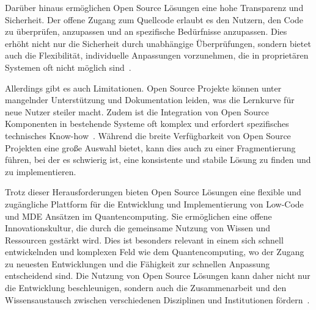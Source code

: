 Darüber hinaus ermöglichen Open Source Lösungen eine hohe Transparenz und Sicherheit. Der offene Zugang 
zum Quellcode erlaubt es den Nutzern, den Code zu überprüfen, anzupassen und an spezifische Bedürfnisse 
anzupassen. Dies erhöht nicht nur die Sicherheit durch unabhängige Überprüfungen, sondern bietet auch 
die Flexibilität, individuelle Anpassungen vorzunehmen, die in proprietären Systemen oft nicht 
möglich sind~\cite{von2006promise}.

Allerdings gibt es auch Limitationen. Open Source Projekte können unter mangelnder Unterstützung und 
Dokumentation leiden, was die Lernkurve für neue Nutzer steiler macht. Zudem ist die Integration von 
Open Source Komponenten in bestehende Systeme oft komplex und erfordert spezifisches technisches 
Know-how~\cite{chesbrough2006open}. Während die breite Verfügbarkeit von Open Source Projekten eine große 
Auswahl bietet, kann dies auch zu einer Fragmentierung führen, bei der es schwierig ist, eine konsistente 
und stabile Lösung zu finden und zu implementieren.

Trotz dieser Herausforderungen bieten Open Source Lösungen eine flexible und zugängliche Plattform für 
die Entwicklung und Implementierung von Low-Code und MDE Ansätzen im Quantencomputing. Sie ermöglichen 
eine offene Innovationskultur, die durch die gemeinsame Nutzung von Wissen und Ressourcen gestärkt 
wird. Dies ist besonders relevant in einem sich schnell entwickelnden und komplexen Feld wie dem 
Quantencomputing, wo der Zugang zu neuesten Entwicklungen und die Fähigkeit zur schnellen Anpassung 
entscheidend sind. Die Nutzung von Open Source Lösungen kann daher nicht nur die Entwicklung 
beschleunigen, sondern auch die Zusammenarbeit und den Wissensaustausch zwischen verschiedenen 
Disziplinen und Institutionen fördern~\cite{west2006challenges}.

